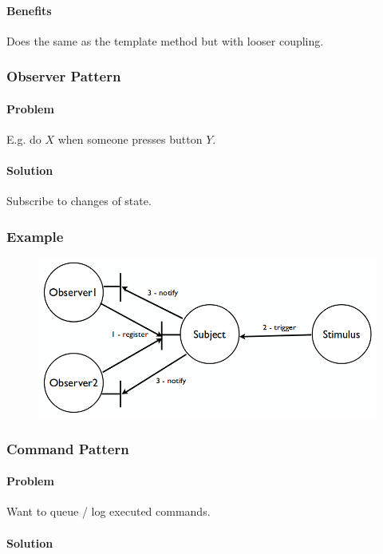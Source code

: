 \documentclass[twocolumn,english]{article}
\begin{document}
\paragraph{Benefits}

Does the same as the template method but with looser coupling.

\subsubsection{Observer Pattern}

\paragraph{Problem}

E.g. do $X$ when someone presses button $Y$.

\paragraph{Solution}

Subscribe to changes of state.

\subsubsection*{Example}

\begin{figure}[H]
\centering{}\includegraphics[width=0.6\columnwidth]{img/observer}
\end{figure}

\subsubsection{Command Pattern}

\paragraph{Problem}

Want to queue / log executed commands.

\paragraph{Solution}
\end{document}
